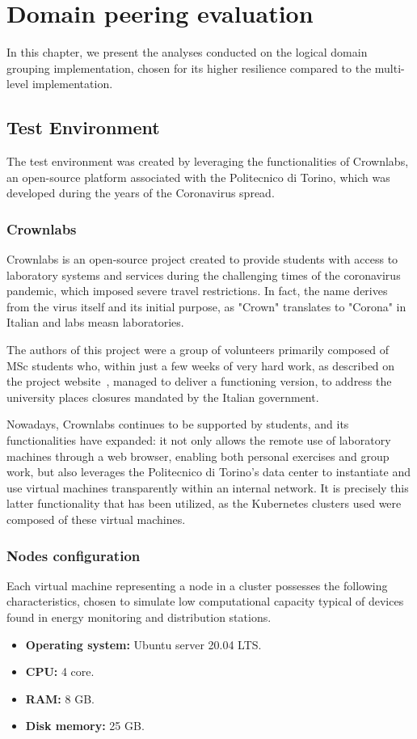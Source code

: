 \chapter{Domain peering evaluation}
In this chapter, we present the analyses conducted on the logical domain grouping implementation, chosen for its higher resilience compared to the multi-level implementation.

\section{Test Environment}
The test environment was created by leveraging the functionalities of Crownlabs, an open-source platform associated with the Politecnico di Torino, which was developed during the years of the Coronavirus spread.

\subsection{Crownlabs}
Crownlabs is an open-source project created to provide students with access to laboratory systems and services during the challenging times of the coronavirus pandemic, which imposed severe travel restrictions. In fact, the name derives from the virus itself and its initial purpose, as "Crown" translates to "Corona" in Italian and labs measn laboratories.

The authors of this project were a group of volunteers primarily composed of MSc students who, within just a few weeks of very hard work, as described on the project website~\cite{e1-1}, managed to deliver a functioning version, to address the university places closures mandated by the Italian government.

Nowadays, Crownlabs continues to be supported by students, and its functionalities have expanded: it not only allows the remote use of laboratory machines through a web browser, enabling both personal exercises and group work, but also leverages the Politecnico di Torino's data center to instantiate and use virtual machines transparently within an internal network. It is precisely this latter functionality that has been utilized, as the Kubernetes clusters used were composed of these virtual machines.

\subsection{Nodes configuration}
Each virtual machine representing a node in a cluster possesses the following characteristics, chosen to simulate low computational capacity typical of devices found in energy monitoring and distribution stations.
\begin{itemize}
\item \textbf{Operating system:}  Ubuntu server 20.04 LTS.
\item \textbf{CPU:} 4 core.
\item \textbf{RAM:} 8 GB.
\item \textbf{Disk memory:} 25 GB.
\end{itemize}

